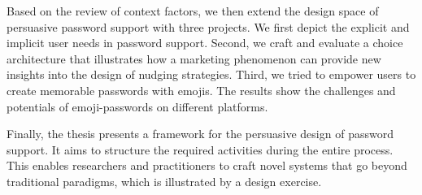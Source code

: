 Based on the review of context factors, we then extend the design space of persuasive password support with three projects. We first depict the explicit and implicit user needs in password support. Second, we craft and evaluate a choice architecture that illustrates how a marketing phenomenon can provide new insights into the design of nudging strategies. Third, we tried to empower users to create memorable passwords with emojis. The results show the challenges and potentials of emoji-passwords on different platforms. 

Finally, the thesis presents a framework for the persuasive design of password support. It aims to structure the required activities during the entire process. This enables researchers and practitioners to craft novel systems that go beyond traditional paradigms, which is illustrated by a design exercise.%

%
%
\clearpage

